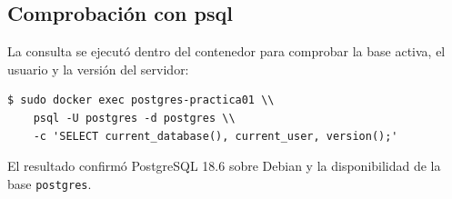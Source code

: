 \subsection{Comprobación con psql}

La consulta se ejecutó dentro del contenedor para comprobar la base activa, el
usuario y la versión del servidor:

\begin{lstlisting}[style=terminal]
$ sudo docker exec postgres-practica01 \\
    psql -U postgres -d postgres \\
    -c 'SELECT current_database(), current_user, version();'
\end{lstlisting}

El resultado confirmó PostgreSQL 18.6 sobre Debian y la disponibilidad de la
base \texttt{postgres}.
